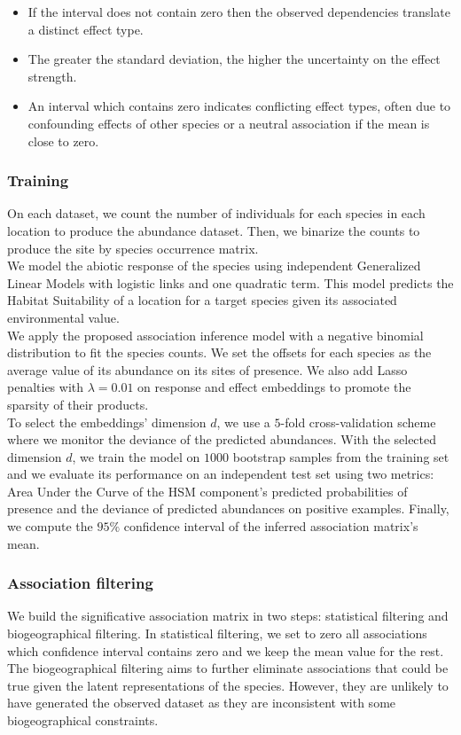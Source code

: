 \documentclass[]{article}
\begin{document}
\begin{itemize}
	\item If the interval does not contain zero then the observed dependencies translate a distinct effect type. 
    \item The greater the standard deviation, the higher the uncertainty on the effect strength.
	\item An interval which contains zero indicates conflicting effect types, often due to confounding effects of other species or a neutral association if the mean is close to zero.  
\end{itemize}

\subsubsection{Training}
On each dataset, we count the number of individuals for each species in each location to produce the abundance dataset. Then, we binarize the counts to produce the site by species occurrence matrix. \\

\noindent We model the abiotic response of the species using independent Generalized Linear Models with logistic links and one quadratic term. This model predicts the Habitat Suitability of a location for a target species given its associated environmental value. \\

\noindent We apply the proposed association inference model with a negative binomial distribution to fit the species counts. We set the offsets for each species as the average value of its abundance on its sites of presence. We also add Lasso penalties with $\lambda=0.01$ on response and effect embeddings to promote the sparsity of their products. \\

\noindent To select the embeddings’ dimension $d$, we use a $5$-fold cross-validation scheme where we monitor the deviance of the predicted abundances. With the selected dimension $d$, we train the model on $1000$ bootstrap samples from the training set and we evaluate its performance on an independent test set using two metrics: Area Under the Curve of the HSM component’s predicted probabilities of presence and the deviance of predicted abundances on positive examples. Finally, we compute the $95\%$ confidence interval of the inferred association matrix's mean. 

\subsubsection{Association filtering}
We build the significative association matrix in two steps: statistical filtering and biogeographical filtering. In statistical filtering, we set to zero all associations which confidence interval contains zero and we keep the mean value for the rest. The biogeographical filtering aims to further eliminate associations that could be true given the latent representations of the species. However, they are unlikely to have generated the observed dataset as they are inconsistent with some biogeographical constraints. \\ 
\end{document}
